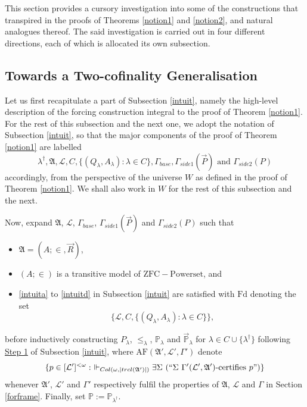 \documentclass[12pt, twoside]{memoir}
\numberwithin{equation}{section}
\theoremstyle{definition}
\theoremstyle{remark}
\theoremstyle{definition}
\theoremstyle{definition}
\theoremstyle{definition}
\theoremstyle{remark}
\begin{document}
This section provides a cursory investigation into some of the constructions that transpired in the proofs of Theorems \ref{notion1} and \ref{notion2}, and natural analogues thereof. The said investigation is carried out in four different directions, each of which is allocated its own subsection.

\subsection{Towards a Two-cofinality Generalisation}\label{2cof}

Let us first recapitulate a part of Subsection \ref{intuit}, namely the high-level description of the forcing construction integral to the proof of Theorem \ref{notion1}. For the rest of this subsection and the next one, we adopt the notation of Subsection \ref{intuit}, so that the major components of the proof of Theorem \ref{notion1} are labelled 
\begin{equation*}
    \lambda^{\dagger}, \mathfrak{A}, \mathcal{L}, C, \{(Q_{\lambda}, A_{\lambda}) : \lambda \in C\}, \Gamma_{base}, \Gamma_{side1}(\Vec{P}) \text{ and } \Gamma_{side2}(P)
\end{equation*}
accordingly, from the perspective of the universe $W$ as defined in the proof of Theorem \ref{notion1}. We shall also work in $W$ for the rest of this subsection and the next. 

Now, expand $\mathfrak{A}$, $\mathcal{L}$, $\Gamma_{base}$, $\Gamma_{side1}(\Vec{P})$ and $\Gamma_{side2}(P)$ such that 
\begin{itemize}
    \item $\mathfrak{A} = (A; \in, \Vec{R})$,
    \item $(A; \in)$ is a transitive model of $\mathrm{ZFC - Powerset}$, and
    \item \ref{intuita} to \ref{intuitd} in Subsection \ref{intuit} are satisfied with $\mathrm{Fd}$ denoting the set 
    \begin{equation*}
        \{\mathcal{L}, C, \{(Q_{\lambda}, A_{\lambda}) : \lambda \in C\}\} \text{,}
    \end{equation*}
\end{itemize}
before inductively constructing $P_{\lambda}$, $\leq_{\lambda}$, $\mathbb{P}_{\lambda}$ and $\Vec{\mathbb{P}}_{\lambda}$ for $\lambda \in C \cup \{\lambda^{\dagger}\}$ following \hyperref[remstep1]{Step 1} of Subsection \ref{intuit}, where $\mathrm{AF}(\mathfrak{A}', \mathcal{L}', \Gamma')$ denote
\begin{equation*}
    \{p \in [\mathcal{L}']^{< \omega} : \ \Vdash_{Col(\omega, |trcl(\mathfrak{A}')|)} \exists \Sigma \ (``\Sigma \ \Gamma'(\mathcal{L}', \mathfrak{A}') \text{-certifies } p")\}
\end{equation*}
whenever $\mathfrak{A}'$, $\mathcal{L}'$ and $\Gamma'$ respectively fulfil the properties of $\mathfrak{A}$, $\mathcal{L}$ and $\Gamma$ in Section \ref{forframe}. Finally, set $\mathbb{P} := \mathbb{P}_{\lambda^{\dagger}}$.
\end{document}
